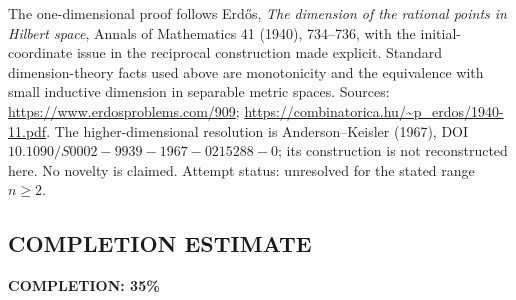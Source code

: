 The one-dimensional proof follows Erd\H{o}s, \emph{The dimension of the rational points in Hilbert space}, Annals of Mathematics 41 (1940), 734--736, with the initial-coordinate issue in the reciprocal construction made explicit. Standard dimension-theory facts used above are monotonicity and the equivalence with small inductive dimension in separable metric spaces.
Sources: \url{https://www.erdosproblems.com/909};
\url{https://combinatorica.hu/~p_erdos/1940-11.pdf}.
The higher-dimensional resolution is Anderson--Keisler (1967), DOI \(10.1090/S0002-9939-1967-0215288-0\); its construction is not reconstructed here. No novelty is claimed. Attempt status: unresolved for the stated range \(n\geq2\).
\subsection*{COMPLETION ESTIMATE}
\textbf{COMPLETION: 35\%}
